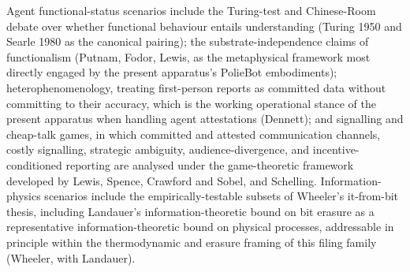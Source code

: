 \documentclass[a4paper,12pt]{article}
\begin{document}
Agent functional-status scenarios include the Turing-test and
Chinese-Room debate over whether functional behaviour entails
understanding (Turing 1950 and Searle 1980 as the canonical
pairing); the substrate-independence claims of functionalism
(Putnam, Fodor, Lewis, as the metaphysical framework most
directly engaged by the present apparatus's PolieBot embodiments);
heterophenomenology, treating first-person reports as committed
data without committing to their accuracy, which is the working
operational stance of the present apparatus when handling agent
attestations (Dennett); and signalling and cheap-talk games, in
which committed and attested communication channels, costly
signalling, strategic ambiguity, audience-divergence, and
incentive-conditioned reporting are analysed under the
game-theoretic framework developed by Lewis, Spence, Crawford
and Sobel, and Schelling. Information-physics scenarios include
the empirically-testable subsets of Wheeler's it-from-bit
thesis, including Landauer's information-theoretic bound on bit
erasure as a representative information-theoretic bound on
physical processes, addressable in principle within the
thermodynamic and erasure framing of this filing family (Wheeler,
with Landauer).
\end{document}
